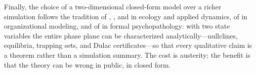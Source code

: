 Finally, the choice of a two-dimensional closed-form model over a richer
simulation follows the tradition of \citet{may1976simple},
\citet{murray2002mathematical}, and \citet{strogatz2015nonlinear} in
ecology and applied dynamics, of \citet{pluchino2010peter} in
organizational modeling, and of \citet{cramer2016depression} in formal
psychopathology: with two state variables the entire phase plane can be
characterized analytically---nullclines, equilibria, trapping sets, and
Dulac certificates---so that every qualitative claim is a theorem rather
than a simulation summary. The cost is austerity; the benefit is that the
theory can be wrong in public, in closed form.

